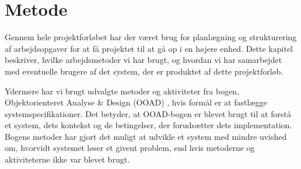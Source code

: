 \chapter{Metode}
\label{chap:metode}

Gennem hele projektforløbet har der været brug for planlægning og strukturering af arbejdsopgaver for at få projektet til at gå op i en højere enhed. Dette kapitel beskriver, hvilke arbejdsmetoder vi har brugt, og hvordan vi har samarbejdet med eventuelle brugere af det system, der er produktet af dette projektforløb.

Ydermere har vi brugt udvalgte metoder og aktiviteter fra bogen, Objektorienteret Analyse \& Design (OOAD) \cite{ooad}, hvis formål er at fastlægge systemspecifikationer. Det betyder, at OOAD-bogen er blevet brugt til at forstå et system, dets kontekst og de betingelser, der forudsætter dets implementation. Bogens metoder har gjort det muligt at udvikle et system med mindre uvished om, hvorvidt systemet løser et givent problem, end hvis metoderne og aktiviteterne ikke var blevet brugt.






